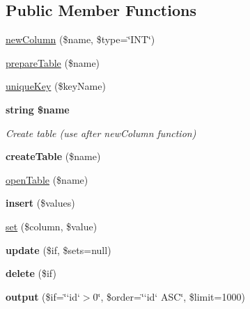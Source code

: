 \subsection*{Public Member Functions}
\begin{DoxyCompactItemize}
\item 
\hyperlink{classmysql_edit_afb4a6a8508ccd874c0ebd19ea9c6d7a3}{new\-Column} (\$name, \$type=\char`\"{}I\-N\-T\char`\"{})
\item 
\hyperlink{classmysql_edit_a20393378a29011bde0843665319c2ec7}{prepare\-Table} (\$name)
\item 
\hyperlink{classmysql_edit_af26ffcc175f4c1824af435ab0181fc47}{unique\-Key} (\$key\-Name)
\end{DoxyCompactItemize}
\begin{Indent}{\bf string \$name}\par
{\em Create table (use after new\-Column function) }\begin{DoxyCompactItemize}
\item 
\hypertarget{classmysql_edit_a1fb0787af4bf5891a0ac1ee919bcda1f}{{\bfseries create\-Table} (\$name)}\label{classmysql_edit_a1fb0787af4bf5891a0ac1ee919bcda1f}

\item 
\hyperlink{classmysql_edit_a46db6a2a866e7edcd9655e57343bda8a}{open\-Table} (\$name)
\item 
\hypertarget{classmysql_edit_ab76a899fa24ade276873e3bd1c34020c}{{\bfseries insert} (\$values)}\label{classmysql_edit_ab76a899fa24ade276873e3bd1c34020c}

\item 
\hyperlink{classmysql_edit_a9c81290e60bed5bcac4f233f8315a02d}{set} (\$column, \$value)
\item 
\hypertarget{classmysql_edit_ab2da7078237b1fc56a1621426df94391}{{\bfseries update} (\$if, \$sets=null)}\label{classmysql_edit_ab2da7078237b1fc56a1621426df94391}

\item 
\hypertarget{classmysql_edit_a54cfa86a296a1717ecdc7c667d8d238e}{{\bfseries delete} (\$if)}\label{classmysql_edit_a54cfa86a296a1717ecdc7c667d8d238e}

\item 
\hypertarget{classmysql_edit_a273362ae49e939816659e808d6b8aadc}{{\bfseries output} (\$if=\char`\"{}`id`$>$0\char`\"{}, \$order=\char`\"{}`id` A\-S\-C\char`\"{}, \$limit=1000)}\label{classmysql_edit_a273362ae49e939816659e808d6b8aadc}

\end{DoxyCompactItemize}
\end{Indent}

